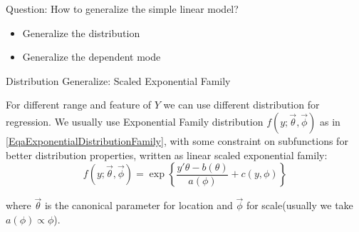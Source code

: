     Question: How to generalize the simple linear model?
\begin{itemize}[topsep=2pt,itemsep=0pt]
    \item Generalize the distribution
    \item Generalize the dependent mode
\end{itemize}

\begin{point}
    Distribution Generalize: Scaled Exponential Family
\end{point}

    For different range and feature of $ Y $ we can use different distribution for regression. We usually use Exponential Family distribution $ f(y;\vec{\theta },\vec{\phi }) $ as in \autoref{EqaExponentialDistributionFamily}, with some constraint on subfunctions for better distribution properties, written as linear scaled exponential family:
\begin{equation}\label{EqaScaledExponentialFamily}
    f(y;\vec{\theta },\vec{\phi})=\exp\left\{ \dfrac{y'\theta -b(\theta )}{a(\phi)}+c(y,\phi ) \right\}
\end{equation}


    where $ \vec{\theta } $ is the canonical parameter for location and $ \vec{\phi } $ for scale(usually we take $ a(\phi )\propto \phi  $).

